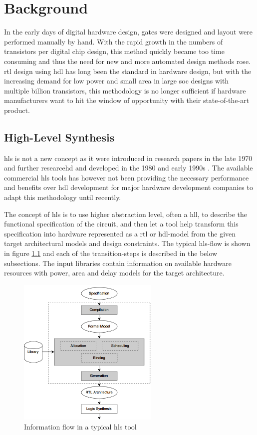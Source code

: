 \chapter{\label{chp:background}Background}
In the early days of digital hardware design, gates were designed and layout were performed manually by hand. With the rapid growth in the numbers of transistors per digital chip design, this method quickly became too time consuming and thus the need for new and more automated design methods rose. \gls{rtl} design using \gls{hdl} has long been the standard in hardware design, but with the increasing demand for low power and small area in large \gls{soc} designs with multiple billion transistors, this methodology is no longer sufficient if hardware manufacturers want to hit the window of opportunity with their state-of-the-art product.

\section{\label{sec:hls}High-Level Synthesis}

 \gls{hls} is not a new concept as it were introduced in research papers in the late 1970 and further researcehd and developed in the 1980 and early 1990s \cite{martin2009high}. The available commercial \gls{hls} tools has however not been providing the necessary performance and benefits over \gls{hdl} development for major hardware development companies to adapt this methodology until recently.

The concept of \gls{hls} is to use higher abstraction level, often a \gls{hll}, to describe the functional specification of the circuit, and then let a tool help transform this specification into hardware represented as a \gls{rtl} or \gls{hdl}-model from the given target architectural models and design constraints. The typical \gls{hls}-flow is shown in figure \ref{fig:hlsflow} and each of the transition-steps is described in the below subsections. The input libraries contain information on available hardware resources with power, area and delay models for the target architecture.

\begin{figure}[hbpt]
\centering
\includegraphics[width=0.6\textwidth]{../figs/HLSFlow.png}
\caption{\label{fig:hlsflow}Information flow in a typical \gls{hls} tool}
\end{figure}

